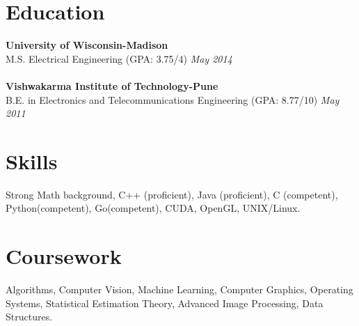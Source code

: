 \documentclass[margin]{res}
\begin{document}
 

 

\address{aashish.thite4189@gmail.com\\www.linkedin.com/in/aashishthite\\https://github.com/aashishthite‎}
\address{\hfill 7800 El Camino Real, Apt\#1125 \\ \hfill Colma, CA-94014, USA\\ \hfill (408) 601-9349}


\begin{resume} 
 

\section{Education} 
{\bf University of Wisconsin-Madison} \\
M.S. Electrical Engineering (GPA: 3.75/4) \hfill {\it May 2014} \\
\\
{\bf Vishwakarma Institute of Technology-Pune} \\
B.E. in Electronics and Telecommunications Engineering (GPA: 8.77/10) \hfill {\it May 2011}

\section{Skills}
Strong Math background, C++ (proficient), Java (proficient), C (competent), Python(competent), Go(competent), CUDA, OpenGL, UNIX/Linux.

\section{Coursework}
Algorithms, Computer Vision, Machine Learning, Computer Graphics, 
Operating Systems, Statistical Estimation Theory, Advanced Image Processing, Data Structures.


\end{resume}
\end{document}
